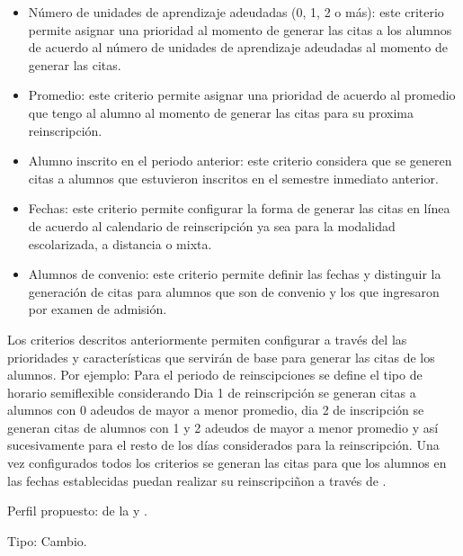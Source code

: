 \begin{Cdescription}
\begin{itemize}
		\item Número de unidades de aprendizaje adeudadas (0, 1, 2 o más): este criterio permite asignar una prioridad al momento de generar las citas a los alumnos de acuerdo al número de unidades de aprendizaje adeudadas al momento de generar las citas.
		\item Promedio: este criterio permite asignar una prioridad de acuerdo al promedio que tengo al alumno al momento de generar las citas para su proxima reinscripción.
		\item Alumno inscrito en el periodo anterior: este criterio considera que se generen citas a alumnos que estuvieron inscritos en el semestre inmediato anterior.
		\item Fechas: este criterio permite configurar la forma de generar las citas en línea de acuerdo al calendario de reinscripción ya sea para la modalidad escolarizada, a distancia o mixta.
		\item Alumnos de convenio: este criterio permite definir las fechas y distinguir la generación de citas para alumnos que son de convenio y los que ingresaron por examen de admisión.
	\end{itemize}
 Los criterios descritos anteriormente permiten configurar a través del  las prioridades y características que servirán de base para generar las citas de los alumnos.  Por ejemplo: Para el periodo de reinscipciones se define el tipo de horario semiflexible considerando Dia 1 de reinscripción se generan citas a alumnos con 0 adeudos de mayor a menor promedio, dia 2 de inscripción  se generan citas de alumnos con 1 y 2 adeudos de mayor a menor promedio y así sucesivamente para el resto de los días considerados para la reinscripción. Una vez configurados todos los criterios se generan las citas para que los alumnos en las fechas establecidas puedan realizar su reinscripciñon a través de .
 
	\item[Perfil propuesto:]  de la  y .
	\item[Tipo:] Cambio.\\
	
\end{Cdescription}

